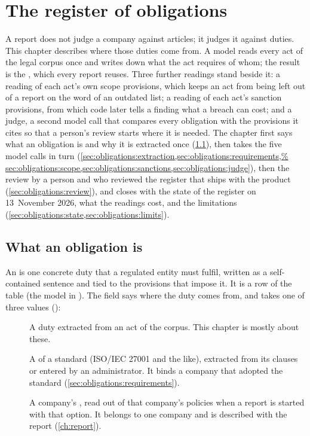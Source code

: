 \chapter{The register of obligations}\label{ch:obligations}

A report does not judge a company against articles; it judges it against duties. This chapter
describes where those duties come from. A model reads every act of the legal corpus once and
writes down what the act requires of whom; the result is the ,
which every report reuses. Three further readings stand beside it: a reading of each act's own
scope provisions, which keeps an act from being left out of a report on the word of an outdated
list; a reading of each act's sanction provisions, from which code later tells a finding what a
breach can cost; and a judge, a second model call that compares every obligation with the provisions
it cites so that a person's review starts where it is needed. The chapter first says what an
obligation is and why it is extracted once (\cref{sec:obligations:what}), then takes the five
model calls in turn (\cref{sec:obligations:extraction,sec:obligations:requirements,%
sec:obligations:scope,sec:obligations:sanctions,sec:obligations:judge}), then the review by a
person and who reviewed the register that ships with the product
(\cref{sec:obligations:review}), and closes with the state of the register on 13~November 2026,
what the readings cost, and the limitations (\cref{sec:obligations:state,sec:obligations:limits}).


\section{What an obligation is}\label{sec:obligations:what}

An  is one concrete duty that a regulated entity must fulfil, written as a
self-contained sentence and tied to the provisions that impose it. It is a row of the table
 (the model  in ). The field
 says where the duty comes from, and takes one of three values
():

\begin{description}
  \item[] A duty extracted from an act of the corpus. This chapter is mostly about
    these.
  \item[] A  of a standard (ISO/IEC 27001 and the like),
    extracted from its clauses or entered by an administrator. It binds a company that adopted
    the standard (\cref{sec:obligations:requirements}).
  \item[] A company's , read out of that company's
    policies when a report is started with that option. It belongs to one company and is
    described with the report (\cref{ch:report}).
\end{description}

